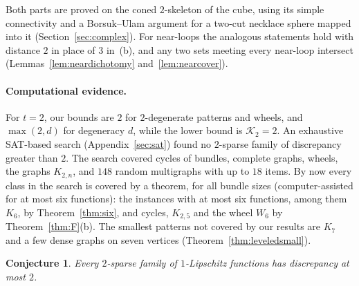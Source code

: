 \documentclass[11pt,letterpaper]{article}
\newtheorem{conjecture}[theorem]{Conjecture}
\theoremstyle{definition}
\begin{document}
Both parts are proved on the coned $2$-skeleton of the cube, using its simple connectivity and a
Borsuk--Ulam argument for a two-cut necklace sphere mapped into it (Section~\ref{sec:complex}). For
near-loops the analogous statements hold with distance $2$ in place of $3$ in~(b), and any two sets
meeting every near-loop intersect (Lemmas~\ref{lem:neardichotomy} and~\ref{lem:nearcover}).

\paragraph{Computational evidence.}
For $t=2$, our bounds are $2$ for $2$-degenerate patterns and wheels, and $\max(2,d)$ for degeneracy
$d$, while the lower bound is $\mathcal{K}_2=2$. An exhaustive SAT-based search (Appendix~\ref{sec:sat})
found no $2$-sparse family of discrepancy greater than $2$. The search covered cycles of bundles,
complete graphs, wheels, the graphs $K_{2,n}$, and $148$ random multigraphs with up to $18$ items. By
now every class in the search is covered by a theorem, for all bundle sizes (computer-assisted for at
most six functions): the instances with at most six functions, among them $K_6$, by Theorem~\ref{thm:six}, and cycles, $K_{2,5}$ and the wheel $W_6$ by
Theorem~\ref{thm:F}(b). The smallest patterns not covered by our results are $K_7$ and a few dense
graphs on seven vertices (Theorem~\ref{thm:leveledsmall}).

\begin{conjecture}\label{conj:two}
Every $2$-sparse family of $1$-Lipschitz functions has discrepancy at most $2$.
\end{conjecture}
\end{document}
